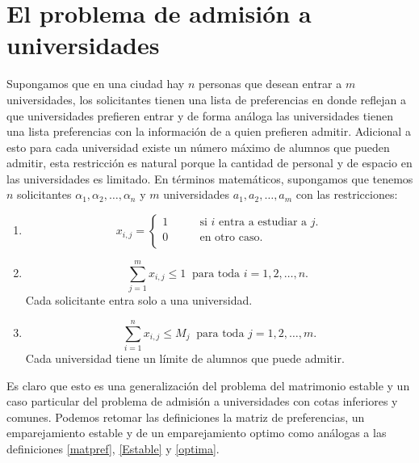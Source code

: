 \section{El problema de admisión a universidades}
Supongamos que en una ciudad hay $n$ personas que desean entrar a $m$ universidades, los solicitantes tienen una lista de preferencias en donde reflejan a que universidades prefieren entrar y de forma análoga las universidades tienen una lista preferencias con la información de a quien prefieren admitir. Adicional a esto para cada universidad existe un número máximo de alumnos que pueden admitir, esta restricción es natural porque la cantidad de personal y de espacio en las universidades es limitado. 
En términos matemáticos, supongamos que tenemos $n$ solicitantes $\alpha_1,\alpha_2,\ldots,\alpha_n$ y $m$ universidades $a_1, a_2,\ldots,a_m$ con las restricciones:
\begin{enumerate}
\item \begin{equation} \label{2r1}
x_{i,j}= 
\begin{cases}
1 & \qquad \text{si $i$ entra a estudiar a $j$.} \\
0 &\qquad\text{en otro caso.}\ \\ 
\end{cases} \end{equation}
\item \begin{equation} \label{2r2}
\sum_{j=1}^{m}x_{i,j} \leq1 \ \text{ para toda $i=1,2,\ldots,n$. }
\end{equation} Cada solicitante entra solo a una universidad. 
\item \begin{equation} \label{2r3}
\sum_{i=1}^{n} x_{i,j} \leq M_j\ \text{ para toda $j=1,2,\dots,m$.} 
\end{equation}
Cada universidad tiene un límite de alumnos que puede admitir. 

\end{enumerate}

Es claro que esto es una generalización del problema del matrimonio estable y un caso particular del problema de admisión a universidades con cotas inferiores y comunes. Podemos retomar las definiciones la matriz de preferencias, un emparejamiento estable y de un emparejamiento optimo como análogas a las definiciones \ref{matpref}, \ref{Estable} y \ref{optima}.

